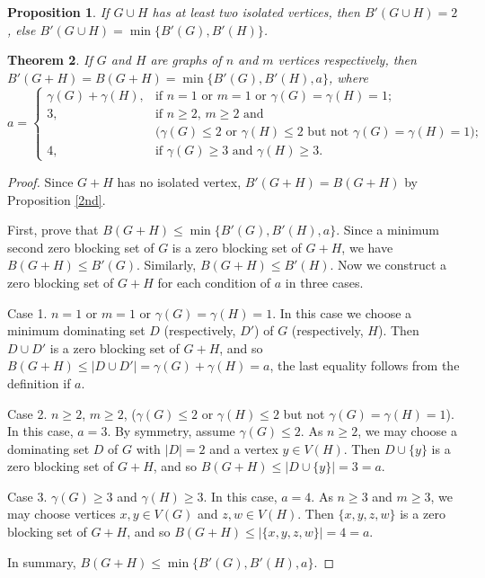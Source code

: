 \documentclass[preprint,12pt]{elsarticle}
\newtheorem{theorem}{Theorem}
\newtheorem{proposition}[theorem]{Proposition}
\begin{document}
{\begin{proposition}
If $G\cup H$ has at least two isolated vertices, 
then $B'(G\cup H)=2$, else $B'(G\cup H)=\min\{B'(G),B'(H)\}$.
\end{proposition}


\begin{theorem} \label{join}
If $G$ and $H$ are graphs of $n$ and $m$ vertices respectively, then
$B'(G+H)=B(G+H)=\min\{B'(G),B'(H),a\}$, where
$$
a=\left\{\begin{array}{ll}
 \gamma(G)+\gamma(H), & \mbox{if $n=1$ or $m=1$ or $\gamma(G)=\gamma(H)=1$}; \\
 3,                   & \mbox{if $n\ge 2$, $m\ge 2$ and}\\ 
                      & \mbox{$(\gamma(G)\le 2$ or $\gamma(H)\le 2$ but not $\gamma(G)=\gamma(H)=1)$}; \\
 4,                   & \mbox{if $\gamma(G)\ge 3$ and $\gamma(H)\ge 3$}.
  \end{array}\right.
$$
\end{theorem}
\begin{proof}
Since $G+H$ has no isolated vertex, $B'(G+H)=B(G+H)$ by Proposition \ref{2nd}.

First, prove that $B(G+H)\le \min\{B'(G),B'(H),a\}$.
Since a minimum second zero blocking set of $G$ is
a zero blocking set of $G+H$, we have $B(G+H)\le B'(G)$.
Similarly, $B(G+H)\le B'(H)$.
Now we construct a zero blocking set of $G+H$ for each condition of $a$ in three cases.

Case 1. $n=1$ or $m=1$ or $\gamma(G)=\gamma(H)=1$.
In this case we choose
a minimum dominating set $D$ (respectively, $D'$) of $G$ (respectively, $H$).
Then $D\cup D'$ is a zero blocking set of $G+H$,
and so $B(G+H)\le |D\cup D'|= \gamma(G)+\gamma(H)=a$, 
the last equality follows from the definition if $a$.

Case 2. $n\ge 2$, $m\ge 2$,
($\gamma(G)\le 2$ or $\gamma(H)\le 2$ but not $\gamma(G)=\gamma(H)=1$).
In this case, $a=3$.
By symmetry, assume $\gamma(G)\le 2$.
As $n\ge 2$, we may choose
a dominating set $D$ of $G$ with $|D|=2$ and a vertex $y\in V(H)$.
Then $D\cup\{y\}$ is a zero blocking set of $G+H$,
and so $B(G+H)\le |D\cup\{y\}| = 3=a$.

Case 3. $\gamma(G)\ge 3$ and $\gamma(H)\ge 3$.
In this case, $a=4$. As $n\ge 3$ and $m\ge 3$, we may choose vertices $x,y\in V(G)$ and $z,w\in V(H)$.
Then $\{x,y,z,w\}$ is a zero blocking set of $G+H$, and so $B(G+H)\le |\{x,y,z,w\}|=4=a$.

In summary, $B(G+H)\le \min\{B'(G),B'(H),a\}$.


\end{proof}}
\end{document}
